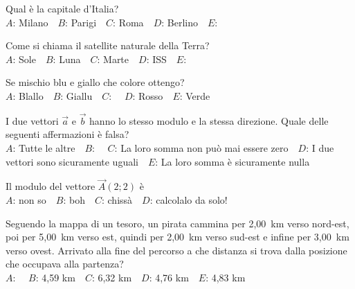 \mcquestionfooter



\def\mcquestionnumber{10}


\mcquestionheader Qual è la capitale d’Italia?\\
{$A$}: Milano\ \ {$B$}: Parigi\ \ {$C$}: Roma\ \ {$D$}: Berlino\ \ {$E$}: \ \ 

\mcquestionfooter



\def\mcquestionnumber{11}


\mcquestionheader Come si chiama il satellite naturale della Terra?\\
{$A$}: Sole\ \ {$B$}: Luna\ \ {$C$}: Marte\ \ {$D$}: ISS\ \ {$E$}: \ \ 

\mcquestionfooter



\def\mcquestionnumber{12}


\mcquestionheader Se mischio blu e giallo che colore ottengo?\\
{$A$}: Blallo\ \ {$B$}: Giallu\ \ {$C$}: \ \ {$D$}: Rosso\ \ {$E$}: Verde\ \ 

\mcquestionfooter



\mcpaperfooter

\def\mcserialnumber{25}
\mcpaperheader


\def\mcquestionnumber{1}


\mcquestionheader I due vettori $\vec{a}$ e $\vec{b}$ hanno lo stesso modulo e la stessa direzione. Quale delle seguenti affermazioni è falsa?\\
{$A$}: Tutte le altre\ \ {$B$}: \ \ {$C$}: La loro somma non può mai essere zero\ \ {$D$}: I due vettori sono sicuramente uguali\ \ {$E$}: La loro somma è sicuramente nulla\ \ 

\mcquestionfooter



\def\mcquestionnumber{2}


\mcquestionheader Il modulo del vettore $\vec{A}(2;2)$ è\\
{$A$}: non so\ \ {$B$}: boh\ \ {$C$}: chissà\ \ {$D$}: calcolalo da solo!\ \ 

\mcquestionfooter



\def\mcquestionnumber{3}


\mcquestionheader Seguendo la mappa di un tesoro, un pirata cammina per 2,00~km verso nord-est, poi per 5,00~km verso est, quindi per 2,00~km verso sud-est e infine per 3,00~km verso ovest. Arrivato alla fine del percorso a che distanza si trova dalla posizione che occupava alla partenza?\\
{$A$}: \ \ {$B$}: 4,59 km\ \ {$C$}: 6,32 km\ \ {$D$}: 4,76 km\ \ {$E$}: 4,83 km\ \ 

